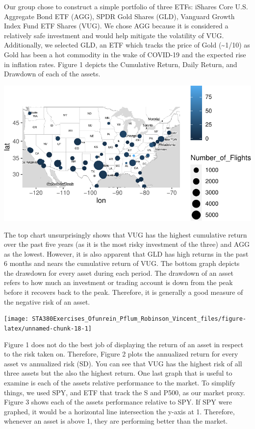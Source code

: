 \documentclass[
]{article}
\begin{document}
Our group chose to construct a simple portfolio of three ETFs: iShares
Core U.S. Aggregate Bond ETF (AGG), SPDR Gold Shares (GLD), Vanguard
Growth Index Fund ETF Shares (VUG). We chose AGG because it is
considered a relatively safe investment and would help mitigate the
volatility of VUG. Additionally, we selected GLD, an ETF which tracks
the price of Gold (\textasciitilde1/10) as Gold has been a hot commodity
in the wake of COVID-19 and the expected rise in inflation rates. Figure
1 depicts the Cumulative Return, Daily Return, and Drawdown of each of
the assets.

\begin{center}\includegraphics{STA380Exercises_Ofunrein_Pflum_Robinson_Vincent_files/figure-latex/unnamed-chunk-17-1} \end{center}

The top chart unsurprisingly shows that VUG has the highest cumulative
return over the past five years (as it is the most risky investment of
the three) and AGG as the lowest. However, it is also apparent that GLD
has high returns in the past 6 months and nears the cumulative return of
VUG. The bottom graph depicts the drawdown for every asset during each
period. The drawdown of an asset refers to how much an investment or
trading account is down from the peak before it recovers back to the
peak. Therefore, it is generally a good measure of the negative risk of
an asset.

\begin{center}\texttt{[image: STA380Exercises\_Ofunrein\_Pflum\_Robinson\_Vincent\_files/figure-latex/unnamed-chunk-18-1]} \end{center}

Figure 1 does not do the best job of displaying the return of an asset
in respect to the risk taken on. Therefore, Figure 2 plots the
annualized return for every asset vs annualized risk (SD). You can see
that VUG has the highest risk of all three assets but the also the
highest return. One last graph that is useful to examine is each of the
assets relative performance to the market. To simplify things, we used
SPY, and ETF that track the S and P500, as our market proxy. Figure 3
shows each of the assets performance relative to SPY. If SPY were
graphed, it would be a horizontal line intersection the y-axis at 1.
Therefore, whenever an asset is above 1, they are performing better than
the market.
\end{document}

